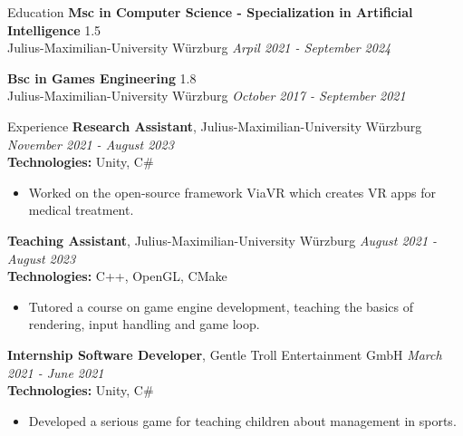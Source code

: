 \documentclass{resume} %
\begin{document}
\begin{rSection}{Education}
{\bf Msc in Computer Science - Specialization in Artificial Intelligence} \hfill {1.5} 
\\ Julius-Maximilian-University Würzburg \hfill {\em Arpil 2021 - September 2024}

{\bf Bsc in Games Engineering} \hfill {1.8} 
\\ Julius-Maximilian-University Würzburg \hfill {\em October 2017 - September 2021}
\end{rSection}

\begin{rSection}{Experience}
{\bf Research Assistant}{, Julius-Maximilian-University Würzburg} \hfill {\em November 2021 - August 2023}\\
{\bf Technologies:} Unity, C\# 
\begin{itemize}
    \item Worked on the open-source framework ViaVR which creates VR apps for medical treatment.
\end{itemize}
{\bf Teaching Assistant}{, Julius-Maximilian-University Würzburg} \hfill {\em August 2021 - August 2023}\\
{\bf Technologies:} C++, OpenGL, CMake
\begin{itemize}
    \item Tutored a course on game engine development, teaching the basics of rendering, input handling and game loop.
\end{itemize}
{\bf Internship Software Developer}{, Gentle Troll Entertainment GmbH} \hfill {\em March 2021 - June 2021}\\
{\bf Technologies:} Unity, C\#
\begin{itemize}
    \item Developed a serious game for teaching children about management in sports.
\end{itemize}
\end{rSection}
\end{document}
